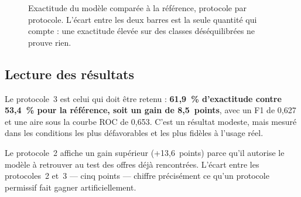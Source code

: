 \documentclass[11pt,a4paper]{article}
\begin{document}
\vspace{3mm}
\begin{figure}[H]
  \centering
  \caption{Exactitude du modèle comparée à la référence, protocole par protocole. L'écart entre les deux barres est la seule quantité qui compte : une exactitude élevée sur des classes déséquilibrées ne prouve rien.}
  \label{fig:resultats}
\end{figure}

\subsection{Lecture des résultats}
Le protocole~3 est celui qui doit être retenu : \textbf{61,9~\% d'exactitude contre 53,4~\% pour la référence, soit un gain de 8,5~points}, avec un F1 de 0,627 et une aire sous la courbe ROC de 0,653. C'est un résultat modeste, mais mesuré dans les conditions les plus défavorables et les plus fidèles à l'usage réel.

Le protocole~2 affiche un gain supérieur (+13,6~points) parce qu'il autorise le modèle à retrouver au test des offres déjà rencontrées. L'écart entre les protocoles~2 et~3 — cinq points — chiffre précisément ce qu'un protocole permissif fait gagner artificiellement.
\end{document}

